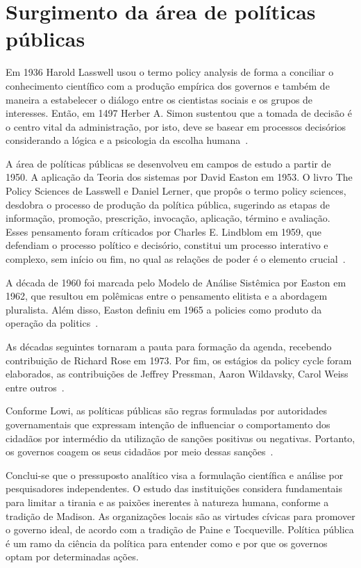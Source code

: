 \section{Surgimento da área de políticas públicas}


Em 1936 Harold Lasswell usou o termo policy analysis de forma a conciliar o conhecimento científico com a produção empírica dos governos e também de maneira a estabelecer o diálogo entre os cientistas sociais e os grupos de interesses. 
Então, em 1497 Herber A. Simon sustentou que a tomada de decisão é o centro vital da administração, por isto, deve se basear em processos decisórios considerando a lógica e a psicologia da escolha humana~\cite{rua2013}.


A área de políticas públicas se desenvolveu em campos de estudo a partir de 1950. 
A aplicação da Teoria dos sistemas por David Easton em 1953.
O livro The Policy Sciences de Lasswell e Daniel Lerner, que propôs o termo policy sciences, desdobra o processo de produção da política pública, sugerindo as etapas de informação, promoção, prescrição, invocação, aplicação, término e avaliação. 
Esses pensamento foram críticados por Charles E. Lindblom em 1959, que defendiam o processo político e decisório, constitui um processo interativo e complexo, sem início ou fim, no qual as relações de poder é o elemento crucial~\cite{rua2013}.

A década de 1960 foi marcada pelo Modelo de Análise Sistêmica por Easton em 1962, que resultou em polêmicas entre o pensamento elitista e a abordagem pluralista. Além disso, Easton definiu em 1965 a policies como produto da operação da politics~\cite{rua2013}.

As décadas seguintes tornaram a pauta para formação da agenda, recebendo contribuição de Richard Rose em 1973. 
Por fim, os estágios da policy cycle foram elaborados, as contribuições de Jeffrey Pressman, Aaron Wildavsky, Carol Weiss entre outros~\cite{rua2013}.

Conforme Lowi, as políticas públicas são regras formuladas por autoridades governamentais que expressam intenção de influenciar o comportamento dos cidadãos por intermédio da utilização de sanções positivas ou negativas. 
Portanto, os governos coagem os seus cidadãos por meio dessas sanções~\cite{rua2013}. 

Conclui-se que o pressuposto analítico visa a formulação científica e análise por pesquisadores independentes. 
O estudo das instituições considera fundamentais para limitar a tirania e as paixões inerentes à natureza humana, conforme a tradição de Madison. 
As organizações locais são as virtudes cívicas para promover o governo ideal, de acordo com a tradição de Paine e Tocqueville. 
Política pública é um ramo da ciência da política para entender como e por que os governos optam por determinadas ações.
